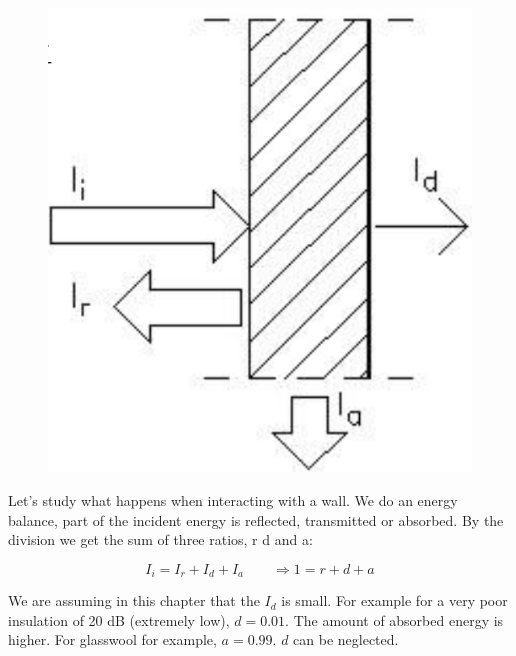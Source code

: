 	\begin{figure}
	\vspace{-5mm}
	\includegraphics[scale=0.2]{acoustics/ch4/2}
	\label{fig:4.2}
	\end{figure}
	Let's study what happens when interacting with a wall. We do an energy balance, part of the incident energy is reflected, transmitted or absorbed. By the division we get the sum of three ratios, r d and a:
	
	\begin{equation}
	I_i = I_r + I_d + I_a \qquad \Rightarrow 1 = r + d + a 
	\end{equation}
		
	 We are assuming in this chapter that the $I_d$ is small. For example for a very poor insulation of 20 dB (extremely low), $d = 0.01$. The amount of absorbed energy is higher. For glasswool for example, $a = 0.99$. $d$ can be neglected. 
	 \ \\
	 
